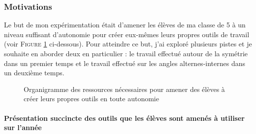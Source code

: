 \subsubsection{Motivations}

Le but de mon expérimentation était d'amener les élèves de ma classe de 5 à un niveau suffisant d'autonomie pour créer eux-mêmes leurs propres outils de travail (voir \textsc{Figure \ref{org:xav}} ci-dessous). Pour atteindre ce but, j'ai exploré plusieurs pistes et je souhaite en aborder deux en particulier : le travail effectué autour de la symétrie dans un premier temps et le travail effectué sur les angles alternes-internes dans un deuxième temps.

\begin{figure}[h!]
    \centering
    
    \caption{Organigramme des ressources nécessaires pour amener des élèves à créer leurs propres outils en toute autonomie}
    \label{org:xav}
\end{figure}

\paragraph{Présentation succincte des outils que les élèves sont amenés à utiliser sur l'année}

